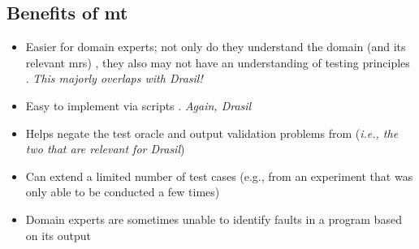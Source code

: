 \subsection[Benefits of MT]{Benefits of \acs{mt}}
\begin{itemize}
    \item Easier for domain experts; not only do they understand the domain
          (and its relevant \acp{mr}) \citep[p.~70]{KanewalaAndYuehChen2019},
          they also may not have an understanding of testing principles
          \citep[p.~69]{KanewalaAndYuehChen2019}. \emph{This majorly
              overlaps with Drasil!}
    \item Easy to implement via scripts \citep[p.~69]{KanewalaAndYuehChen2019}.
          \emph{Again, Drasil}
    \item Helps negate the test oracle \citep[p.~69]{KanewalaAndYuehChen2019}
          and output validation \citep[p.~70]{KanewalaAndYuehChen2019} problems
          from  (\emph{i.e.,
              the two that are relevant for Drasil})
    \item Can extend a limited number of test cases (e.g., from an
          experiment that was only able to be conducted a few times)
          \citep[pp.~70-72]{KanewalaAndYuehChen2019}
    \item Domain experts are sometimes unable to identify faults in a program
          based on its output \citep[p.~71]{KanewalaAndYuehChen2019}
\end{itemize}

